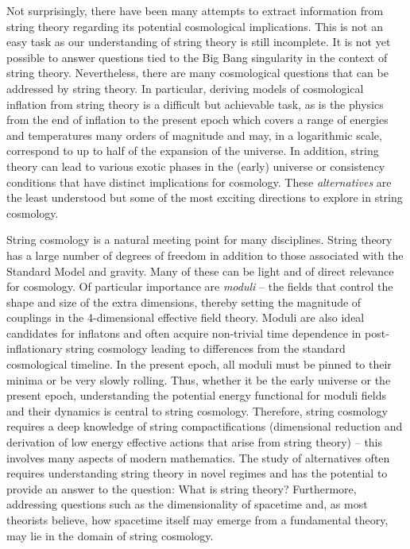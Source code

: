 Not surprisingly, there have been many attempts to extract information from string theory regarding its potential cosmological implications. This is not an easy task as our understanding of string theory is still incomplete. It is not yet possible to answer questions tied to the Big Bang singularity in the
context of string theory. Nevertheless, there are many cosmological questions that can be addressed by string theory. In particular, deriving models of cosmological inflation from string theory is a difficult but achievable task, as is the physics from the end of inflation to the present epoch which
covers a range of energies and temperatures many orders of magnitude and may, in a logarithmic scale, correspond to up to half of the expansion of the universe.  In addition, string theory can lead to various exotic phases in the (early) universe or consistency conditions that have  distinct implications for cosmology. These {\it alternatives} are the least understood but some of  the  most exciting directions to explore in string cosmology.

String cosmology is a natural meeting point for many disciplines. String theory has a large number of degrees of freedom in addition to those associated with the Standard Model and gravity. Many of these can be  light and of direct relevance for cosmology. Of particular importance are {\it moduli} -- the fields that control the shape and size of the extra dimensions, thereby setting the magnitude
 of couplings in the 4-dimensional effective field theory. Moduli are also ideal candidates for inflatons and often acquire non-trivial time dependence in post-inflationary string cosmology leading to differences from the standard cosmological timeline. In the present epoch, all moduli must be pinned to their minima or be very slowly rolling. Thus, whether it be the  early universe or the present epoch, understanding the potential energy functional for moduli fields and their dynamics is central to string cosmology. Therefore, string cosmology requires a deep  knowledge of string compactifications (dimensional reduction and  derivation of low energy effective actions that
 arise from string theory) -- this  involves  many aspects of modern  mathematics. The study of
 alternatives often requires  understanding string theory in novel regimes and has the potential to provide an  answer to the question:  What is string theory? Furthermore, addressing  questions such as the dimensionality of spacetime and, as most theorists believe, how spacetime itself may emerge from a fundamental theory, may lie in the domain of string cosmology. 
 
